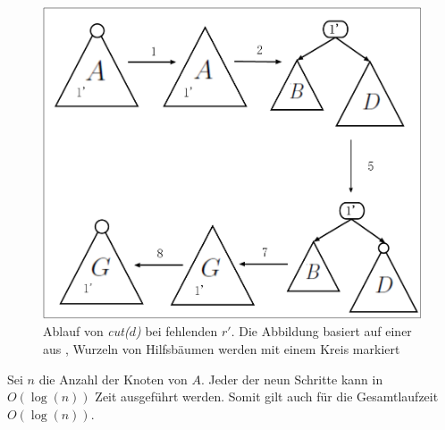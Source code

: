\documentclass[a4paper,12pt]{article}
\begin{document}
\begin{figure}[H]
	\centering
	\includegraphics[width=1\textwidth]{"Medien/Tango/cut2"}
	\caption{Ablauf von \textit{cut($d$)} bei fehlenden $r'$. Die Abbildung basiert auf einer aus \cite{demainDinamicOpti}, Wurzeln von Hilfsbäumen werden mit einem Kreis markiert }
	\label{fig:cut2}
\end{figure}
\noindent Sei $n$ die Anzahl der Knoten von $A$. Jeder der neun Schritte kann in $O\left(\log \left(n\right)\right)$ Zeit ausgeführt werden. Somit gilt auch für die Gesamtlaufzeit $O\left(\log \left(n\right)\right)$.
\end{document}
